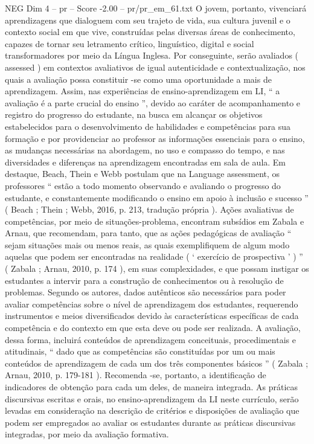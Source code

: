 \begin{textsample}{NEG Dim 4 – pr – Score -2.00 – pr/pr\_em\_61.txt}
O jovem, portanto, vivenciará aprendizagens que dialoguem com seu trajeto de vida, sua cultura juvenil e o contexto social em que vive, construídas pelas diversas áreas de conhecimento, capazes de tornar seu letramento crítico, linguístico, digital e social transformadores por meio da Língua Inglesa.
Por conseguinte, serão avaliados ( assessed ) em contextos avaliativos de igual autenticidade e contextualização, nos quais a avaliação possa constituir -se como uma oportunidade a mais de aprendizagem.
Assim, nas experiências de ensino-aprendizagem em LI, “ a avaliação é a parte crucial do ensino ”, devido ao caráter de acompanhamento e registro do progresso do estudante, na busca em alcançar os objetivos estabelecidos para o desenvolvimento de habilidades e competências para sua formação e por providenciar ao professor as informações essenciais para o ensino, as mudanças necessárias na abordagem, no uso e compasso do tempo, e nas diversidades e diferenças na aprendizagem encontradas em sala de aula.
Em destaque, Beach, Thein e Webb postulam que na Language assessment, os professores “ estão a todo momento observando e avaliando o progresso do estudante, e constantemente modificando o ensino em apoio à inclusão e sucesso ” ( Beach ; Thein ; Webb, 2016, p. 213, tradução própria ).
Ações avaliativas de competências, por meio de situações-problema, encontram subsídios em Zabala e Arnau, que recomendam, para tanto, que as ações pedagógicas de avaliação “ sejam situações mais ou menos reais, as quais exemplifiquem de algum modo aquelas que podem ser encontradas na realidade ( ‘ exercício de prospectiva ’ ) ” ( Zabala ; Arnau, 2010, p. 174 ), em suas complexidades, e que possam instigar os estudantes a intervir para a construção de conhecimentos ou à resolução de problemas.
Segundo os autores, dados autênticos são necessários para poder avaliar competências sobre o nível de aprendizagem dos estudantes, requerendo instrumentos e meios diversificados devido às características específicas de cada competência e do contexto em que esta deve ou pode ser realizada.
A avaliação, dessa forma, incluirá conteúdos de aprendizagem conceituais, procedimentais e atitudinais, “ dado que as competências são constituídas por um ou mais conteúdos de aprendizagem de cada um dos três componentes básicos ” ( Zabala ; Arnau, 2010, p. 179-181 ).
Recomenda -se, portanto, a identificação de indicadores de obtenção para cada um deles, de maneira integrada.
As práticas discursivas escritas e orais, no ensino-aprendizagem da LI neste currículo, serão levadas em consideração na descrição de critérios e disposições de avaliação que podem ser empregados ao avaliar os estudantes durante as práticas discursivas integradas, por meio da avaliação formativa.

\end{textsample}
